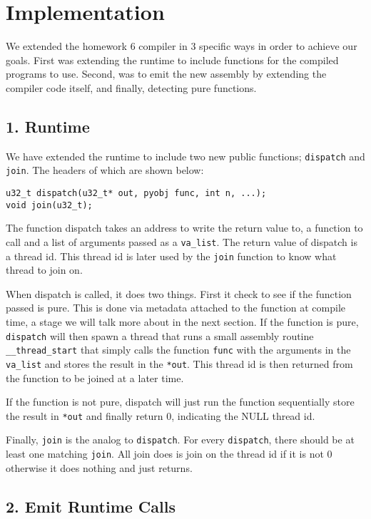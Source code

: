 \documentclass{acm_proc_article-sp}
\begin{document}
\section*{Implementation}

We extended the homework 6 compiler in 3 specific ways in order to achieve our
goals. First was extending the runtime to include functions for the compiled
programs to use. Second, was to emit the new assembly by extending the compiler
code itself, and finally, detecting pure functions.

\subsection*{1. Runtime}
We have extended the runtime to include two new public functions; \verb|dispatch| and
\verb|join|. The headers of which are shown below:

\begin{verbatim}
u32_t dispatch(u32_t* out, pyobj func, int n, ...);
void join(u32_t);
\end{verbatim}

The function dispatch takes an address to write the return value to, a function
to call and a list of arguments passed as a \verb|va_list|. The return value of
dispatch is a thread id. This thread id is later used by the \verb|join| function
to know what thread to join on.

When dispatch is called, it does two things. First it check to see if the
function passed is pure. This is done via metadata attached to the function at
compile time, a stage we will talk more about in the next section. If the
function is pure, \verb|dispatch| will then spawn a thread that runs a small
assembly routine \verb|__thread_start| that simply calls the function
\verb|func| with the arguments in the \verb|va_list| and stores the result in
the \verb|*out|. This thread id is then returned from the function to be joined
at a later time.

If the function is not pure, dispatch will just run the function sequentially
store the result in \verb|*out| and finally return 0, indicating the NULL
thread id.

Finally, \verb|join| is the analog to \verb|dispatch|. For every \verb|dispatch|,
there should be at least one matching \verb|join|. All join does is join on the thread
id if it is not 0 otherwise it does nothing and just returns.

\subsection*{2. Emit Runtime Calls}
\end{document}
